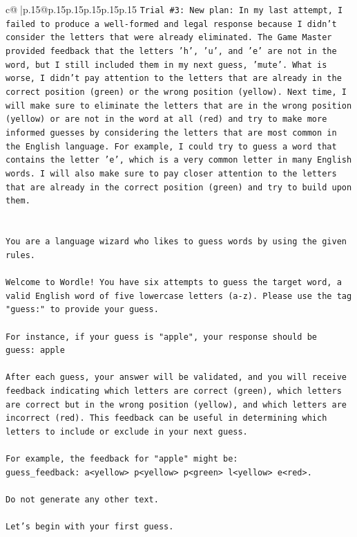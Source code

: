 \documentclass{article}
\begin{document}
{\begin{supertabular}{c@{$\;$}|p{.15\linewidth}@{}p{.15\linewidth}p{.15\linewidth}p{.15\linewidth}p{.15\linewidth}p{.15\linewidth}}
{{{\texttt{Trial \#3: New plan: In my last attempt, I failed to produce a well{-}formed and legal response because I didn't consider the letters that were already eliminated. The Game Master provided feedback that the letters 'h', 'u', and 'e' are not in the word, but I still included them in my next guess, 'mute'. What is worse, I didn't pay attention to the letters that are already in the correct position (green) or the wrong position (yellow). Next time, I will make sure to eliminate the letters that are in the wrong position (yellow) or are not in the word at all (red) and try to make more informed guesses by considering the letters that are most common in the English language. For example, I could try to guess a word that contains the letter 'e', which is a very common letter in many English words. I will also make sure to pay closer attention to the letters that are already in the correct position (green) and try to build upon them.} \\
\\ 
\\ 
\texttt{You are a language wizard who likes to guess words by using the given rules.} \\
\\ 
\texttt{Welcome to Wordle! You have six attempts to guess the target word, a valid English word of five lowercase letters (a{-}z). Please use the tag "guess:" to provide your guess.} \\
\\ 
\texttt{For instance, if your guess is "apple", your response should be} \\
\texttt{guess: apple} \\
\\ 
\texttt{After each guess, your answer will be validated, and you will receive feedback indicating which letters are correct (green), which letters are correct but in the wrong position (yellow), and which letters are incorrect (red). This feedback can be useful in determining which letters to include or exclude in your next guess.} \\
\\ 
\texttt{For example, the feedback for "apple" might be:} \\
\texttt{guess\_feedback: a<yellow> p<yellow> p<green> l<yellow> e<red>.} \\
\\ 
\texttt{Do not generate any other text.} \\
\\ 
\texttt{Let's begin with your first guess.} \\
            }
        }
    }
     \\ \\


\end{supertabular}}
\end{document}
